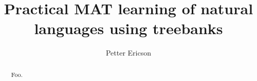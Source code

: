 \title{Practical MAT learning of natural languages using treebanks}

\author{Petter Ericson}


\maketitle%

\begin{abstract}
Foo.
\end{abstract}
